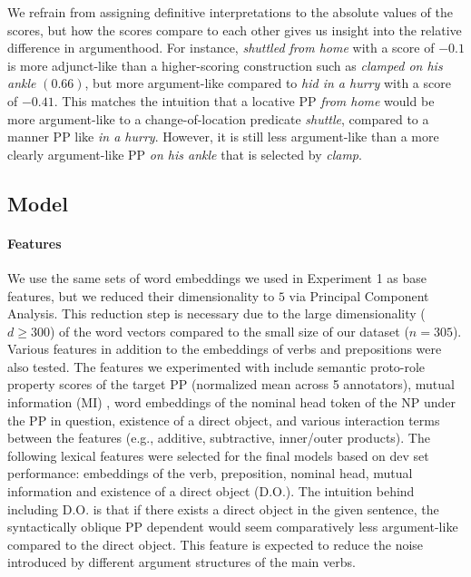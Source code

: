 \documentclass[letterpaper]{article} %
\begin{document}
\noindent We refrain from assigning definitive interpretations to the absolute values of the scores, but how the scores compare to each other gives us insight into the relative difference in argumenthood. For instance, \textit{shuttled from home} with a score of $-0.1$ is more adjunct-like than a higher-scoring construction such as \textit{clamped on his ankle} $(0.66)$, but more argument-like compared to \textit{hid in a hurry} with a score of $-0.41$. This matches the intuition that a locative PP \textit{from home} would be more argument-like to a change-of-location predicate \textit{shuttle}, compared to a manner PP like \textit{in a hurry}. However, it is still less argument-like than a more clearly argument-like PP \textit{on his ankle} that is selected by \textit{clamp}.


\subsection{Model}
\label{ex2:model}


\paragraph{Features}
We use the same sets of word embeddings we used in Experiment 1 as base features, but we reduced their dimensionality to $5$ via Principal Component Analysis. This reduction step is necessary due to the large dimensionality ($d \ge 300$) of the word vectors compared to the small size of our dataset ($n=305$).  Various features in addition to the embeddings of verbs and prepositions were also tested. The features we experimented with include semantic proto-role property scores \cite{reisinger2015semantic} of the target PP (normalized mean across 5 annotators), mutual information (MI) \cite{aldezabal2002learning}, word embeddings of the nominal head token of the NP under the PP in question, existence of a direct object, and various interaction terms between the features (e.g., additive, subtractive, inner/outer products). The following lexical features were selected for the final models based on dev set performance: embeddings of the verb, preposition, nominal head, mutual information and existence of a direct object (D.O.). The intuition behind including D.O. is that if there exists a direct object in the given sentence, the syntactically oblique PP dependent would seem comparatively less argument-like compared to the direct object. This feature is expected to reduce the noise introduced by different argument structures of the main verbs.
\end{document}
